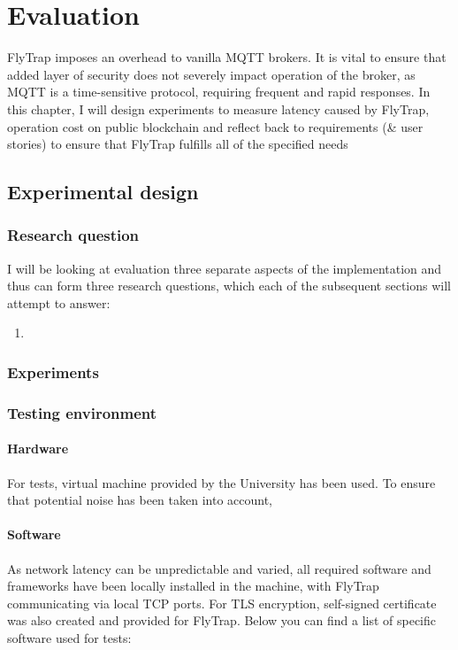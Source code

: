 \chapter{Evaluation}\label{chap:evaluation}
FlyTrap imposes an overhead to vanilla MQTT brokers. It is vital to ensure that added layer of security does not severely impact operation of the broker, as MQTT is a time-sensitive protocol, requiring frequent and rapid responses. In this chapter, I will design experiments to measure latency caused by FlyTrap, operation cost on public blockchain and reflect back to requirements (\& user stories) to ensure that FlyTrap fulfills all of the specified needs

\section{Experimental design}
\subsection{Research question}
I will be looking at evaluation three separate aspects of the implementation and thus can form three research questions, which each of the subsequent sections will attempt to answer:
\begin{enumerate}
  \item  
\end{enumerate}
\subsection{Experiments}
\subsection{Testing environment}
\subsubsection{Hardware}
For tests, virtual machine provided by the University has been used. To ensure that potential noise has been taken into account,  
\subsubsection{Software}
As network latency can be unpredictable and varied, all required software and frameworks have been locally installed in the machine, with FlyTrap communicating via local TCP ports. For TLS encryption, self-signed certificate was also created and provided for FlyTrap. Below you can find a list of specific software used for tests:

